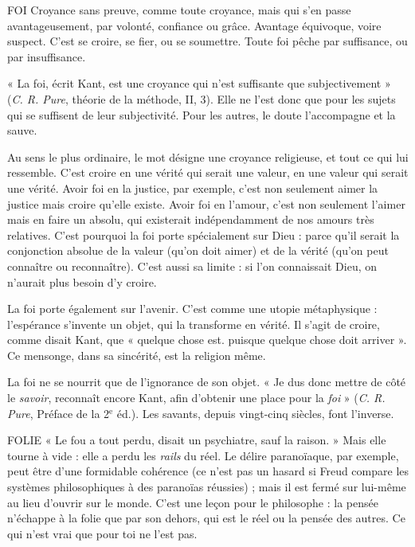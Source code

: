 FOI  Croyance sans preuve, comme toute croyance, mais qui s’en passe avantageusement,
par volonté, confiance ou grâce. Avantage équivoque,
voire suspect. C’est se croire, se fier, ou se soumettre. Toute foi pêche par suffisance,
ou par insuffisance.

« La foi, écrit Kant, est une croyance qui n’est suffisante que subjectivement »
({\it C. R. Pure}, théorie de la méthode, II, 3). Elle ne l’est donc que
pour les sujets qui se suffisent de leur subjectivité. Pour les autres, le doute
l'accompagne et la sauve.

Au sens le plus ordinaire, le mot désigne une croyance religieuse, et tout ce
qui lui ressemble. C’est croire en une vérité qui serait une valeur, en une valeur
qui serait une vérité. Avoir foi en la justice, par exemple, c’est non seulement
aimer la justice mais croire qu’elle existe. Avoir foi en l’amour, c’est non seulement
l’aimer mais en faire un absolu, qui existerait indépendamment de nos
amours très relatives. C’est pourquoi la foi porte spécialement sur Dieu : parce
qu’il serait la conjonction absolue de la valeur (qu’on doit aimer) et de la vérité
(qu’on peut connaître ou reconnaître). C’est aussi sa limite : si l’on connaissait
Dieu, on n’aurait plus besoin d’y croire.

La foi porte également sur l'avenir. C’est comme une utopie métaphysique :
l’espérance s’invente un objet, qui la transforme en vérité. Il s’agit de
croire, comme disait Kant, que « quelque chose est. puisque quelque chose
doit arriver ». Ce mensonge, dans sa sincérité, est la religion même.

La foi ne se nourrit que de l’ignorance de son objet. « Je dus donc mettre
de côté le {\it savoir}, reconnaît encore Kant, afin d’obtenir une place pour la {\it foi} »
({\it C. R. Pure}, Préface de la 2$^\text{e}$ éd.). Les savants, depuis vingt-cinq siècles, font
l'inverse.

FOLIE  « Le fou a tout perdu, disait un psychiatre, sauf la raison. » Mais elle
tourne à vide : elle a perdu les {\it rails} du réel. Le délire paranoïaque,
par exemple, peut être d’une formidable cohérence (ce n’est pas un hasard si
Freud compare les systèmes philosophiques à des paranoïas réussies) ; mais il
est fermé sur lui-même au lieu d’ouvrir sur le monde. C’est une leçon pour le
philosophe : la pensée n’échappe à la folie que par son dehors, qui est le réel ou
la pensée des autres. Ce qui n’est vrai que pour toi ne l’est pas.

